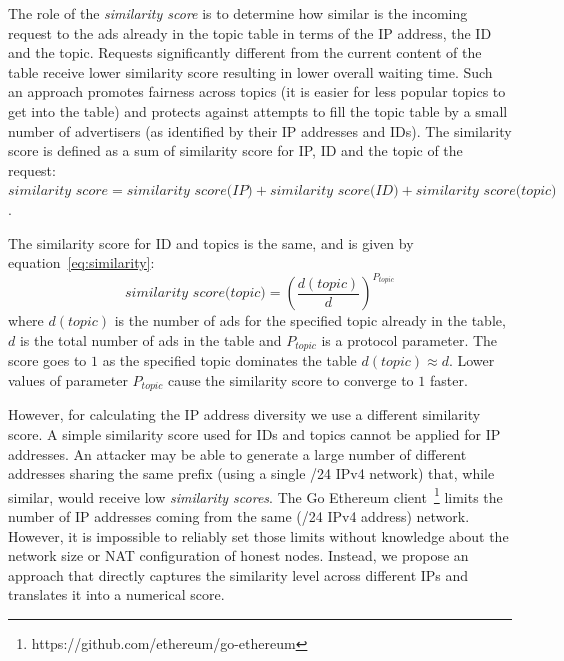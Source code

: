 The role of the \emph{similarity score} is to determine how similar is the incoming request to the ads already in the topic table in terms of the IP address, the ID and the topic. 
Requests significantly different from the current content of the table receive lower similarity score resulting in lower overall waiting time. 
Such an approach promotes fairness across topics (it is easier for less popular topics to get into the table) and protects against attempts to fill the topic table by a small number of advertisers (as identified by their IP addresses and IDs). The similarity score is defined as a sum of similarity score for IP, ID and the topic of the request: $\textit{similarity score} = \textit{similarity score(IP)} + \textit{similarity score(ID)} + \textit{similarity score(topic)}$. 

The similarity score for ID and topics is the same, and is given by equation~\ref{eq:similarity}:
\begin{equation}
\label{eq:similarity}
    \textit{similarity score(topic)}= (\frac{d(topic)}{d})^{P_{topic}} 
\end{equation}
where $d(topic)$ is the number of ads for the specified topic already in the table, $d$ is the total number of ads in the table and $P_{topic}$ is a protocol parameter. 
The score goes to $1$ as the specified topic dominates the table $d(topic)  \approx  d$. 
Lower values of parameter $P_{topic}$ cause the similarity score to converge to $1$ faster. 

However,  for calculating the IP address diversity we use a different similarity score. 
A simple similarity score used for IDs and topics cannot be applied for IP addresses. 
An attacker may be able to generate a large number of different addresses sharing the same prefix (\eg using a single /24 IPv4 network) that, while similar, would receive low \emph{similarity scores}. 
The Go Ethereum client~\footnote{https://github.com/ethereum/go-ethereum} limits the number of IP addresses coming from the same (\eg /24 IPv4 address) network.
However,  it is impossible to reliably set those limits without knowledge about the network size or NAT configuration of honest nodes. 
Instead, we propose an approach that directly captures the similarity level across different IPs and translates it into a numerical score. 

